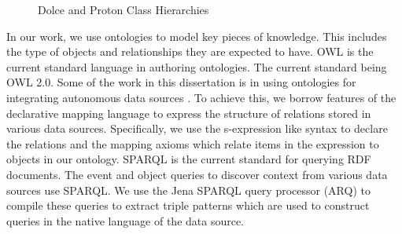 \begin{figure}[ht]
\begin{minipage}[b]{0.45\linewidth}
\end{minipage}
\caption{Dolce and Proton Class Hierarchies}
\label{fig:ontology-hierarchies}
\end{figure}

In our work, we use ontologies to model key pieces of knowledge. This includes the type of objects and relationships they are expected to have. OWL is the current standard language in authoring ontologies. The current standard being OWL 2.0. Some of the work in this dissertation is in using ontologies for integrating autonomous data sources \cite{smith2007obo, noy2004semantic, astakhov2005data}. To achieve this, we borrow  features of the declarative mapping language \cite{dou2005ontology} to express the structure of relations stored in various data sources. Specifically, we use the s-expression like syntax to declare the relations and the mapping axioms which relate items in the expression to objects in our ontology. SPARQL \cite{prud2008sparql} is the current standard for querying RDF documents. The event and object queries to discover context from various data sources use SPARQL. We use the Jena \cite{carroll2004jena} SPARQL query processor (ARQ) to compile these queries to extract triple patterns which are used to construct queries in the native language of the data source.

